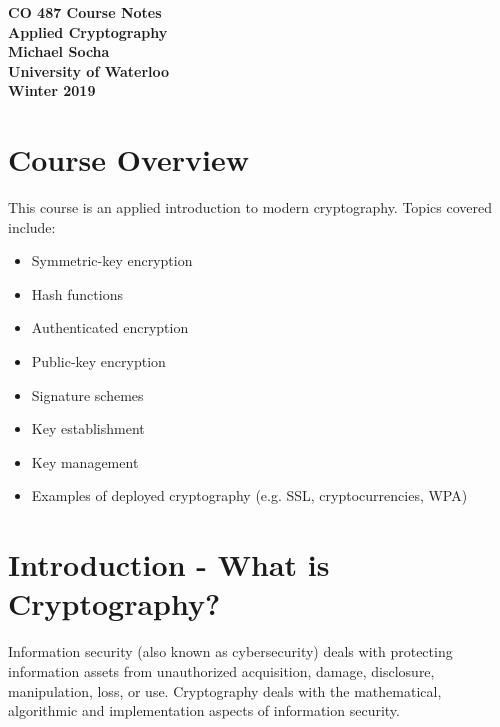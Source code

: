 \documentclass[12pt,titlepage]{article}
\let\stdsection\section
\renewcommand\section{\clearpage\stdsection}
\begin{document}
  \begin{titlepage}
    \vspace*{\fill}
    \centering

    \textbf{\Huge CO 487 Course Notes} \\ [0.4em]
    \textbf{\Large Applied Cryptography} \\ [1em]
    \textbf{\Large Michael Socha} \\ [1em]
    \textbf{\large University of Waterloo} \\
    \textbf{\large Winter 2019} \\
    \vspace*{\fill}
  \end{titlepage}

  \newpage 


  \tableofcontents

  \newpage


  \section{Course Overview}
    This course is an applied introduction to modern cryptography. Topics covered include:
    \begin{itemize}
      \item Symmetric-key encryption
      \item Hash functions
      \item Authenticated encryption
      \item Public-key encryption
      \item Signature schemes
      \item Key establishment
      \item Key management
      \item Examples of deployed cryptography (e.g. SSL, cryptocurrencies, WPA)
    \end{itemize}

  \section{Introduction - What is Cryptography?}
    Information security (also known as cybersecurity) deals with protecting information assets from
    unauthorized acquisition, damage, disclosure, manipulation, loss, or use. Cryptography deals with
    the mathematical, algorithmic and implementation aspects of information security.
\end{document}
